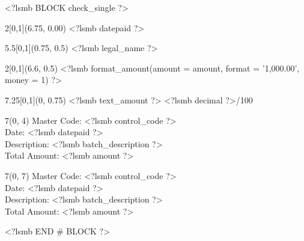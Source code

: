 \usepackage{textpos}

\usepackage[top=1.5in, bottom=.25in, left=.25in, right=.25in]{geometry}
\setlength{\TPHorizModule}{1in}
\setlength{\TPVertModule}{1in}
<?lsmb BLOCK check_single ?>
%
%

\begin{textblock}{2}[0,1](6.75, 0.00)
<?lsmb datepaid ?>
\end{textblock}
\begin{textblock}{5.5}[0,1](0.75, 0.5)
<?lsmb legal_name ?>
\end{textblock}


\begin{textblock}{2}[0,1](6.6, 0.5)
<?lsmb format_amount({amount = amount, format = '1,000.00', money = 1}) ?>
\end{textblock}
\begin{textblock}{7.25}[0,1](0, 0.75)
<?lsmb text_amount ?> \dotfill <?lsmb decimal ?>/100 \makebox[0.5cm]{\hfill}
\end{textblock}
\vspace{0.5cm}

%
%
%
%
%
%
%
%
%
%
%
%
%


\begin{textblock}{7}(0, 4)
\vspace{0.5cm}
\noindent Master Code: <?lsmb control_code ?> \\
Date:  <?lsmb datepaid ?>\\
Description: <?lsmb batch_description ?>\\
Total Amount: <?lsmb amount ?>\\
\end{textblock}

\begin{textblock}{7}(0, 7)
\vspace{0.5cm}
\noindent Master Code: <?lsmb control_code ?> \\
Date:  <?lsmb datepaid ?>\\
Description: <?lsmb batch_description ?>\\
Total Amount: <?lsmb amount ?>\\
\end{textblock}

\vfill
<?lsmb END # BLOCK ?>
